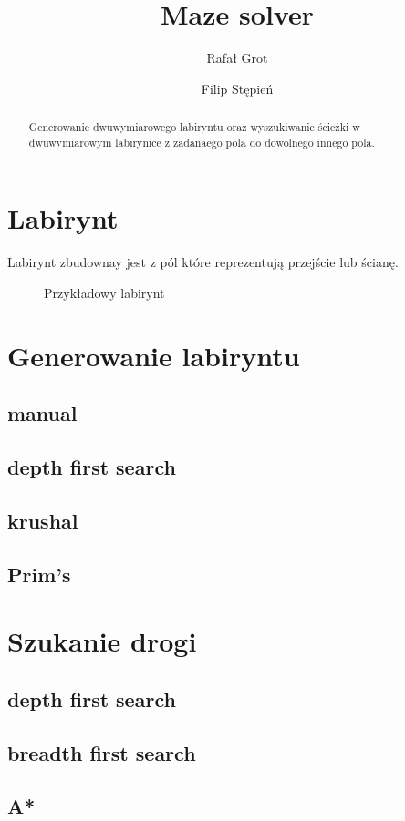 \documentclass{article}
\title{Maze solver}
\author{Rafał Grot \and Filip Stępień}
\begin{document}
\maketitle

\begin{abstract}
  Generowanie dwuwymiarowego labiryntu oraz wyszukiwanie ścieżki w dwuwymiarowym labirynice z zadanaego pola do dowolnego innego pola.
\end{abstract}

\newcommand{\GridWidth}{8}   %
\newcommand{\GridHeight}{6}  %


\section{Labirynt}

Labirynt zbudownay jest z pól które reprezentują przejście lub ścianę.

\begin{figure}[ht]
  \begin{center}
    
  \end{center}
  \caption{Przykładowy labirynt}
\end{figure}

\faUser
{}

\section{Generowanie labiryntu}
\subsection{manual}
\subsection{depth first search}
\subsection{krushal}
\subsection{Prim's}

\section{Szukanie drogi}
\subsection{depth first search}
\subsection{breadth first search}
\subsection{A*}
\end{document}
